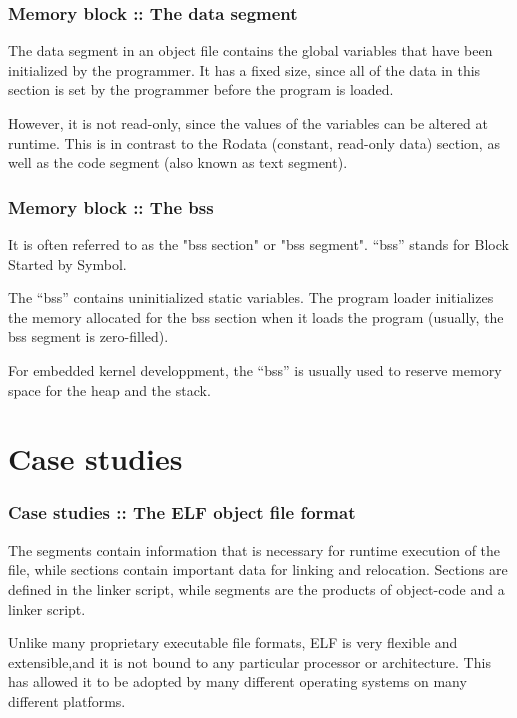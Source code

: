 
\begin{frame}
  \frametitle{Memory block :: The data segment}

The data segment in an object file contains the global variables that
have been initialized by the programmer. It has a fixed size, since all
of the data in this section is set by
the programmer before the program is loaded.

\-

However, it is not read-only,
since the values of the variables can be altered at runtime.
This is in contrast to the Rodata (constant, read-only data) section,
as well as the code segment (also known as text segment).

\end{frame}


\begin{frame}
  \frametitle{Memory block :: The bss}

It is often referred to as the
"bss section" or "bss segment". ``bss'' stands for Block Started by Symbol.

\-

The ``bss'' contains uninitialized static variables. The program loader initializes the
memory allocated for the bss section when it loads the program (usually,
the bss segment is zero-filled).

\-

For embedded kernel developpment, the ``bss'' is usually used to reserve memory space
for the heap and the stack.

\end{frame}



%
%

\section{Case studies}


\begin{frame}
  \frametitle{Case studies :: The ELF object file format}

The segments contain information that is necessary for runtime execution
of the file, while sections contain important data for linking and
relocation. Sections are defined in the linker script, while segments are
the products of object-code and a linker script.

\-

Unlike many proprietary executable file formats, ELF is very flexible and
extensible,and it is not bound to any particular processor or architecture. This has allowed
it to be adopted by many different operating systems on many different platforms.

\end{frame}

